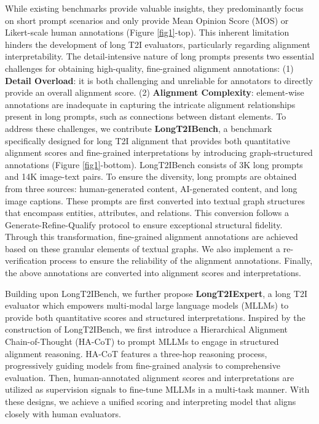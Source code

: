 \documentclass[letterpaper]{article} %
\begin{document}
While existing benchmarks provide valuable insights, they predominantly focus on short prompt scenarios and only provide Mean Opinion Score (MOS) or Likert-scale human annotations (Figure \ref{fig1}-top). This inherent limitation hinders the development of long T2I evaluators, particularly regarding alignment interpretability. The detail-intensive nature of long prompts presents two essential challenges for obtaining high-quality, fine-grained alignment annotations: (1) \textbf{Detail Overload}: it is both challenging and unreliable for annotators to directly provide an overall alignment score. (2) \textbf{Alignment Complexity}: element-wise annotations are inadequate in capturing the intricate alignment relationships present in long prompts, such as connections between distant elements. To address these challenges, we contribute \textbf{LongT2IBench}, a benchmark specifically designed for long T2I alignment that provides both quantitative alignment scores and fine-grained interpretations by introducing graph-structured annotations (Figure \ref{fig1}-bottom). LongT2IBench consists of 3K long prompts and 14K image-text pairs. To ensure the diversity, long prompts are obtained from three sources: human-generated content, AI-generated content, and long image captions. These prompts are first converted into textual graph structures that encompass entities, attributes, and relations. This conversion follows a Generate-Refine-Qualify protocol to ensure exceptional structural fidelity. Through this transformation, fine-grained alignment annotations are achieved based on these granular elements of textual graphs. We also implement a re-verification process to ensure the reliability of the alignment annotations. Finally, the above annotations are converted into alignment scores and interpretations.

Building upon LongT2IBench, we further propose \textbf{LongT2IExpert}, a long T2I evaluator which empowers multi-modal large language models (MLLMs) to provide both quantitative scores and structured interpretations. Inspired by the construction of LongT2IBench, we first introduce a Hierarchical Alignment Chain-of-Thought (HA-CoT) to prompt MLLMs to engage in structured alignment reasoning. HA-CoT features a three-hop reasoning process, progressively guiding models from fine-grained analysis to comprehensive evaluation. Then, human-annotated alignment scores and interpretations are utilized as supervision signals to fine-tune MLLMs in a multi-task manner. With these designs, we achieve a unified scoring and interpreting model that aligns closely with human evaluators.
\end{document}
